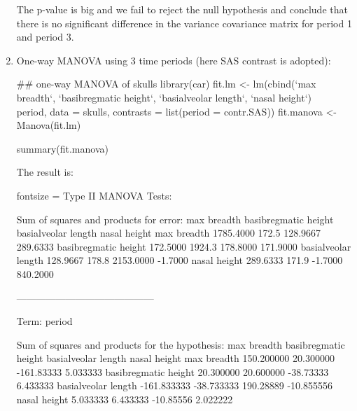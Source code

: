 \documentclass{article}
\begin{document}
\begin{enumerate}[leftmargin = 0 em, label = \arabic*., font = \bfseries]
The p-value is big and we fail to reject the null hypothesis and conclude that there is no significant difference in the variance covariance matrix for period 1 and period 3.

\item 
One-way MANOVA using 3 time periods (here SAS contrast is adopted):
\begin{rcode}
## one-way MANOVA of skulls
library(car)
fit.lm <- lm(cbind(`max breadth`, `basibregmatic height`, `basialveolar length`, `nasal height`) ~ period, data = skulls, contrasts = list(period = contr.SAS))
fit.manova <- Manova(fit.lm)

summary(fit.manova)
\end{rcode}
The result is:
\begin{rcode*}{fontsize = \footnotesize}
Type II MANOVA Tests:

Sum of squares and products for error:
                     max breadth basibregmatic height basialveolar length nasal height
max breadth            1785.4000                172.5            128.9667     289.6333
basibregmatic height    172.5000               1924.3            178.8000     171.9000
basialveolar length     128.9667                178.8           2153.0000      -1.7000
nasal height            289.6333                171.9             -1.7000     840.2000

------------------------------------------
 
Term: period 

Sum of squares and products for the hypothesis:
                     max breadth basibregmatic height basialveolar length nasal height
max breadth           150.200000            20.300000          -161.83333     5.033333
basibregmatic height   20.300000            20.600000           -38.73333     6.433333
basialveolar length  -161.833333           -38.733333           190.28889   -10.855556
nasal height            5.033333             6.433333           -10.85556     2.022222


\end{rcode*}
\end{enumerate}
\end{document}
